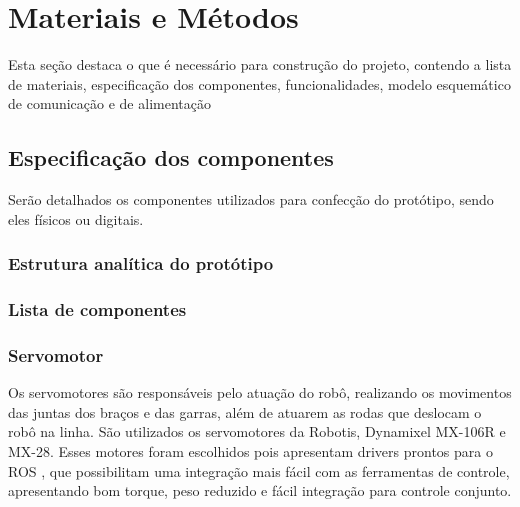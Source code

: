 \chapter{Materiais e Métodos}
\label{chap:mat}
Esta seção destaca o que é necessário para construção do projeto, contendo a lista de materiais, especificação dos componentes, funcionalidades, modelo esquemático de comunicação e de alimentação


\section{Especificação dos componentes}
\label{sec:espc}
Serão detalhados os componentes utilizados para confecção do protótipo, sendo eles físicos ou digitais.

\subsection{Estrutura analítica do protótipo}
\label{ssec:pbs}


\subsection{Lista de componentes}
\label{ssec:list}

\subsection{Servomotor}
Os servomotores são responsáveis pelo atuação do robô, realizando os movimentos das juntas dos braços e das garras, além de atuarem as rodas que deslocam o robô na linha. São utilizados os servomotores da Robotis, Dynamixel MX-106R e MX-28. Esses motores foram escolhidos pois apresentam drivers prontos para o ROS , que possibilitam uma integração mais fácil com as ferramentas de controle, apresentando bom torque, peso reduzido e fácil integração para controle conjunto.


